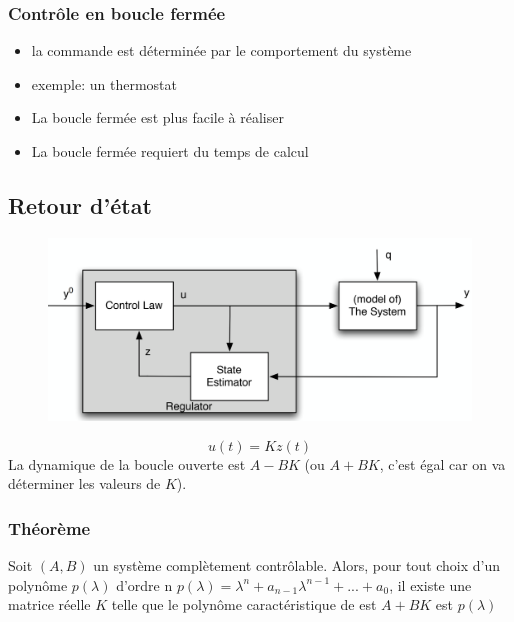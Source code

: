 \documentclass[resume]{subfiles}
\begin{document}
\subsubsection{Contrôle en boucle fermée}
\begin{itemize}
\item la commande est déterminée par le comportement du
  système
\item exemple: un thermostat
\item La boucle fermée est plus facile à réaliser
\item La boucle fermée requiert du temps de calcul  
\end{itemize}

\subsection{Retour d'état}

\begin{figure}[H]
    \centering
    \includegraphics[width=1\columnwidth]{Figures/CtrlStab_2.png}
\end{figure}
$$u(t)=Kz(t)$$
La dynamique de la boucle ouverte est $A-BK$ (ou $A+BK$, c'est égal car on va déterminer les valeurs de $K$).

\subsubsection{Théorème}

Soit $(A, B)$ un système complètement contrôlable. Alors, pour tout choix d'un polynôme $p (\lambda)$ d'ordre n $p (\lambda) = \lambda^n + a_{n-1}\lambda^{n-1} +...+ a_0$,
il existe une matrice réelle $K$ telle que le polynôme caractéristique de est $A + BK$ est $p (\lambda)$ 
\end{document}
